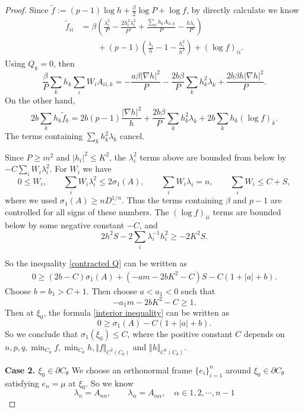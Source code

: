 \documentclass[11pt]{amsart}
\numberwithin{equation} {section}
\numberwithin{equation}{section}
\begin{document}
\begin{proof}
Since $\tilde f:=(p-1)\log h+\frac{\beta}{2}\log P+\log f$, by directly calculate we know
\begin{equation}\label{f second derivatives}
\begin{split}
        \tilde f_{ii}
        &=\beta\left(
        \frac{\lambda_i^2}{P}
        -\frac{2h_i^2\lambda_i^2}{P^2}
        +\frac{\sum_k h_kA_{ii,k}}{P}
        -\frac{h\lambda_i}{P}\right)\\
        &\qquad
        +(p-1)\left(\frac{\lambda_i}{h}-1-\frac{h_i^2}{h^2}\right)
        +(\log f)_{ii}.
\end{split}
\end{equation}
Using $Q_k=0$, then
\[
      \frac{\beta}{P}
        \sum_kh_k\sum_iW_iA_{ii,k}=  -\frac{a\beta|\nabla h|^2}{P}
        -\frac{2b\beta}{P}\sum_kh_k^2\lambda_k
        +\frac{2b\beta h|\nabla h|^2}{P}.
\]
On the other hand,
\[
        2b\sum_kh_k\tilde f_k
        =2b(p-1)\frac{|\nabla h|^2}{h}
        +\frac{2b\beta}{P}\sum_kh_k^2\lambda_k
        +2b\sum_kh_k(\log f)_k.
\]
The terms containing $\sum_kh_k^2\lambda_k$ cancel.

Since
$P\geq m^2$ and $|h_i|^2\leq K^2$, the $\lambda_i^2$ terms above
are bounded from below by $-C\sum_iW_i\lambda_i^2$. For $W_i$ we have
\[
        0\leq W_i,\qquad
        \sum_iW_i\lambda_i^2\leq 2\sigma_1(A),\qquad
        \sum_iW_i\lambda_i= n,\qquad
        \sum_iW_i\leq C+S,
\]
where we used $\sigma_1(A)\geq nD_-^{1/n}$. Thus the terms containing
$\beta$ and $p-1$ are controlled for all signs of these numbers. The
$(\log f)_{ii}$ terms are bounded below by some negative constant $-C$, and
\[
        2h^2S-2\sum_i\lambda_i^{-1}h_i^2\geq -2K^2S.
\]

So the inequality \eqref{contracted Q} can be written as
\begin{equation}\label{interior inequality}
\begin{split}
        0\geq
        (2b-C)\sigma_1(A)+(-am-2bK^2-C)S
        -C(1+|a|+b).
\end{split}
\end{equation}
Choose $b=b_1>C+1$. Then choose $a<a_1<0$ such that
\[
        -a_1m-2bK^2-C\geq 1.
\]
Then at $\xi_0$, the formula \eqref{interior inequality} can be written as 
\[
        0\geq \sigma_1(A) - C(1+|a|+b).
\]
So we conclude that $\sigma_1(\xi_0)\leq C$, where the positive constant $C$ depends on $n, p, q, \min_{C_{\theta}}f, \min_{C_{\theta}}h, \Vert f\Vert_{C^2 (C_{\theta})}$ and $\Vert h\Vert _{C^0 (C_{\theta})}$.

\noindent\textbf{Case 2. $\xi_0\in \partial C_{\theta}$}
We choose an orthonormal frame $\{e_i\}_{i=1}^n$ around $\xi_0\in\partial C_{\theta}$ satisfying $e_n=\mu$ at $\xi_0$. So we know 
\[
        \lambda_n=A_{nn},\qquad
        \lambda_{\alpha}=A_{\alpha\alpha}, \quad \alpha\in 1,2,\cdots, n-1
\]


\end{proof}
\end{document}
